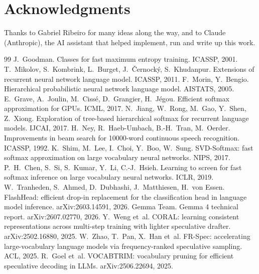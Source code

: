 \documentclass[11pt]{article}
\begin{document}
\section*{Acknowledgments}
Thanks to Gabriel Ribeiro for many ideas along the way, and to Claude (Anthropic), the AI assistant that helped implement, run and write up this work.


\begin{thebibliography}{99}
 J.~Goodman. Classes for fast maximum entropy training. ICASSP, 2001.
 T.~Mikolov, S.~Kombrink, L.~Burget, J.~\v{C}ernock\'y, S.~Khudanpur. Extensions of recurrent neural network language model. ICASSP, 2011.
 F.~Morin, Y.~Bengio. Hierarchical probabilistic neural network language model. AISTATS, 2005.
 E.~Grave, A.~Joulin, M.~Ciss\'e, D.~Grangier, H.~J\'egou. Efficient softmax approximation for GPUs. ICML, 2017.
 N.~Jiang, W.~Rong, M.~Gao, Y.~Shen, Z.~Xiong. Exploration of tree-based hierarchical softmax for recurrent language models. IJCAI, 2017.
 H.~Ney, R.~Haeb-Umbach, B.-H.~Tran, M.~Oerder. Improvements in beam search for 10000-word continuous speech recognition. ICASSP, 1992.
 K.~Shim, M.~Lee, I.~Choi, Y.~Boo, W.~Sung. SVD-Softmax: fast softmax approximation on large vocabulary neural networks. NIPS, 2017.
 P.~H.~Chen, S.~Si, S.~Kumar, Y.~Li, C.-J.~Hsieh. Learning to screen for fast softmax inference on large vocabulary neural networks. ICLR, 2019.
 W.~Tranheden, S.~Ahmed, D.~Dubhashi, J.~Matthiesen, H.~von Essen. FlashHead: efficient drop-in replacement for the classification head in language model inference. arXiv:2603.14591, 2026.
 Gemma Team. Gemma 4 technical report. arXiv:2607.02770, 2026.
 Y.~Weng et~al. CORAL: learning consistent representations across multi-step training with lighter speculative drafter. arXiv:2502.16880, 2025.
 W.~Zhao, T.~Pan, X.~Han et~al. FR-Spec: accelerating large-vocabulary language models via frequency-ranked speculative sampling. ACL, 2025.
 R.~Goel et~al. VOCABTRIM: vocabulary pruning for efficient speculative decoding in LLMs. arXiv:2506.22694, 2025.

\end{thebibliography}
\end{document}

